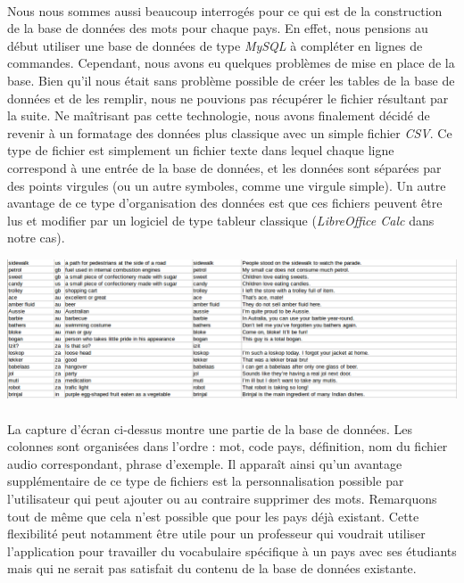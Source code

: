 \documentclass[11pt, a4paper]{report}
\begin{document}
\paragraph{}Nous nous sommes aussi beaucoup interrogés pour ce qui est de la construction de la base de données des mots pour chaque pays. En effet, nous pensions au début utiliser une base de données de type \textit{MySQL} à compléter en lignes de commandes. Cependant, nous avons eu quelques problèmes de mise en place de la base. Bien qu'il nous était sans problème possible de créer les tables de la base de données et de les remplir, nous ne pouvions pas récupérer le fichier résultant par la suite. Ne maîtrisant pas cette technologie, nous avons finalement décidé de revenir à un formatage des données plus classique avec un simple fichier \textit{CSV}. Ce type de fichier est simplement un fichier texte dans lequel chaque ligne correspond à une entrée de la base de données, et les données sont séparées par des points virgules (ou un autre symboles, comme une virgule simple).
Un autre avantage de ce type d'organisation des données est que ces fichiers peuvent être lus et modifier par un logiciel de type tableur classique (\textit{LibreOffice Calc} dans notre cas).

\vspace{0.5cm}
\centerline{\includegraphics[scale=0.4]{images/database.png}}

\paragraph{}La capture d'écran ci-dessus montre une partie de la base de données. Les colonnes sont organisées dans l'ordre : mot, code pays, définition, nom du fichier audio correspondant, phrase d'exemple. Il apparaît ainsi qu'un avantage supplémentaire de ce type de fichiers est la personnalisation possible par l'utilisateur qui peut ajouter ou au contraire supprimer des mots. Remarquons tout de même que cela n'est possible que pour les pays déjà existant. Cette flexibilité peut notamment être utile pour un professeur qui voudrait utiliser l'application pour travailler du vocabulaire spécifique à un pays avec ses étudiants mais qui ne serait pas satisfait du contenu de la base de données existante.
\end{document}
